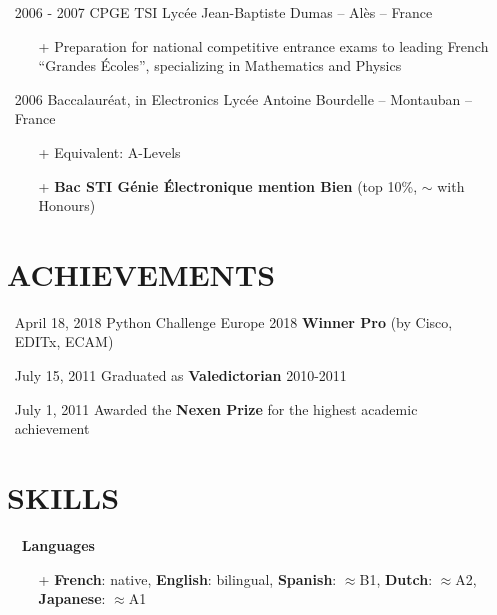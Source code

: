 \documentclass{res}
\begin{document}
\begin{resume}
\begin{itemize}
\item[] 2006 - 2007 \tabto{2cm} CPGE TSI \hfill Lyc\'ee Jean-Baptiste Dumas -- Al\`es -- France
        \begin{itemize}
                \item[+] Preparation for national competitive entrance exams to leading French ``Grandes \'Ecoles'', specializing in Mathematics and Physics
        \end{itemize}
        
\item[] 2006 \tabto{2cm} Baccalaur\'eat, in Electronics \hfill Lyc\'ee Antoine Bourdelle -- Montauban -- France
        \begin{itemize}
                \item[+] Equivalent: A-Levels
                \item[+] \textbf{Bac STI G\'enie \'Electronique mention Bien} (top 10\%, $\sim$ with Honours)
        \end{itemize}
\end{itemize}


\section{\faMedal~ACHIEVEMENTS}
\begin{itemize}
        \item[] April 18, 2018 \tabto{4cm} Python Challenge Europe 2018 \textbf{Winner Pro} (by Cisco, EDITx, ECAM)
        \item[] July 15, 2011 \tabto{4cm} Graduated as \textbf{Valedictorian} 2010-2011
        \item[] July 1, 2011 \tabto{4cm} Awarded the \textbf{Nexen Prize} for the highest academic achievement
\end{itemize}


\section{\faLayerGroup~SKILLS}
        \begin{itemize}
                \item[] \faLanguage~\textbf{Languages}
                \begin{itemize}
                 \item[+]  \textbf{French}: native, \textbf{English}: bilingual, \textbf{Spanish}: $\approx$B1, \textbf{Dutch}: $\approx$A2, \textbf{Japanese}: $\approx$A1
                \end{itemize}   
        \end{itemize}
        

\end{resume}
\end{document}
